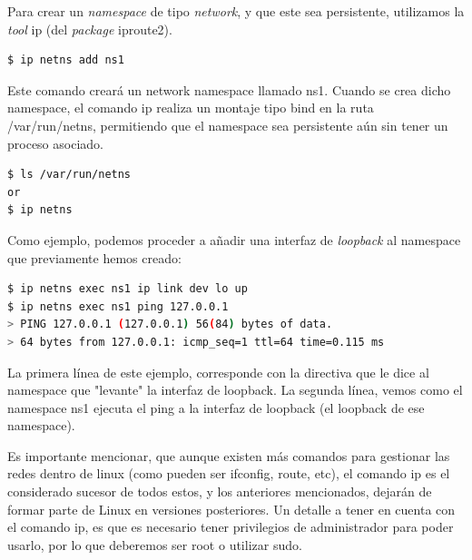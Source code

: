 \documentclass[12pt]{article}
\begin{document}
	\par \noindent Para crear un \textit{namespace} de tipo \textit{network}, y que este sea persistente, utilizamos la \textit{tool} ip (del \textit{package} iproute2).
	\begin{lstlisting}[language=bash, caption=Creation persistent network namespace]
$ ip netns add ns1
	\end{lstlisting}

	\par \noindent Este comando creará un network namespace llamado ns1. Cuando se crea dicho namespace, el comando ip realiza un montaje tipo bind en la ruta /var/run/netns, permitiendo que el namespace sea persistente aún sin tener un proceso asociado.
	\begin{lstlisting}[language=bash, caption=Comprobar network namespaces existentes]
$ ls /var/run/netns
or
$ ip netns
	\end{lstlisting}
	
	\addvspace{10px}

	\par \noindent Como ejemplo, podemos proceder a añadir una interfaz de \textit{loopback} al namespace que previamente hemos creado:
	\begin{lstlisting}[language=bash, caption=Asignar interfaz loopback a un namespace]
$ ip netns exec ns1 ip link dev lo up
$ ip netns exec ns1 ping 127.0.0.1
> PING 127.0.0.1 (127.0.0.1) 56(84) bytes of data. 
> 64 bytes from 127.0.0.1: icmp_seq=1 ttl=64 time=0.115 ms
	\end{lstlisting}

	\par \noindent La primera línea de este ejemplo, corresponde con la directiva que le dice al namespace que "levante" la interfaz de loopback. La segunda línea, vemos como el namespace ns1 ejecuta el ping a la interfaz de loopback (el loopback de ese namespace).
	
	\addvspace{10px}
	
	\par \noindent Es importante mencionar, que aunque existen más comandos para gestionar las redes dentro de linux (como pueden ser ifconfig, route, etc), el comando ip es el considerado sucesor de todos estos, y los anteriores mencionados, dejarán de formar parte de Linux en versiones posteriores. Un detalle a tener en cuenta con el comando ip, es que es necesario tener privilegios de administrador para poder usarlo, por lo que deberemos ser root o utilizar sudo.
	
	\addvspace{10px}
	
\end{document}
